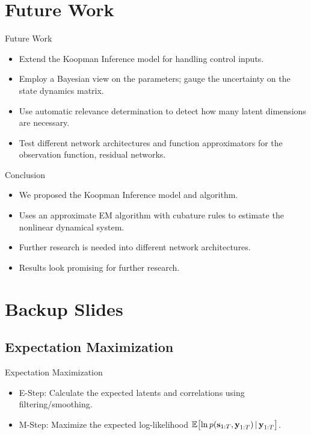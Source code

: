 \documentclass[
	aspectratio=43,
	color={accentcolor=1c},
	logo=false,
	colorframetitle=true,
	handout
]{tudabeamer}
\begin{document}
	\section{Future Work}
		\begin{frame}{Future Work}
			\begin{itemize}
				\item Extend the Koopman Inference model for handling control inputs.
				\item Employ a Bayesian view on the parameters; gauge the uncertainty on \eg the state dynamics matrix.
				\item Use automatic relevance determination to detect how many latent dimensions are necessary.
				\item Test different network architectures and function approximators for the observation function, \eg residual networks.
			\end{itemize}
		\end{frame}

		\begin{frame}{Conclusion}
			\begin{itemize}
				\item We proposed the Koopman Inference model and algorithm.
				\item Uses an approximate EM algorithm with cubature rules to estimate the nonlinear dynamical system.
				\item Further research is needed into \eg different network architectures.
				\item Results look promising for further research.
			\end{itemize}
		\end{frame}





	\appendix

	\section{Backup Slides} \sectionslide
		\subsection{Expectation Maximization}
			\begin{frame}{Expectation Maximization}
				\begin{itemize}
					\item E-Step: Calculate the expected latents and correlations using filtering/smoothing.
					\item M-Step: Maximize the expected log-likelihood \( \mathbb{E}\big[\! \ln p(\boldsymbol{\mathrm{s}}_{1:T}, \boldsymbol{\mathrm{y}}_{1:T}) \,\vert\, \boldsymbol{\mathrm{y}}_{1:T} \big] \).
				\end{itemize}
			\end{frame}
\end{document}
